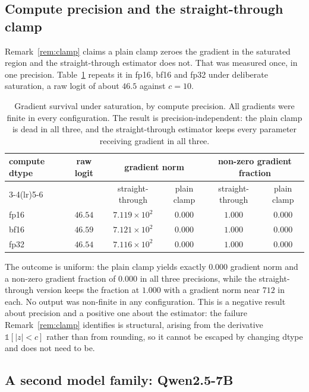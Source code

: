 \documentclass[10pt]{article}
\theoremstyle{plain}
\theoremstyle{definition}
\theoremstyle{remark}
\begin{document}
\subsection{Compute precision and the straight-through clamp}
\label{sec:precision}

Remark~\ref{rem:clamp} claims a plain clamp zeroes the gradient in the saturated region
and the straight-through estimator does not. That was measured once, in one precision.
Table~\ref{tab:precision} repeats it in fp16, bf16 and fp32 under deliberate saturation, a
raw logit of about $46.5$ against $c{=}10$.

\begin{table}[!ht]
\centering\small
\begin{tabular}{lccccc}
\toprule
compute dtype & raw logit & \multicolumn{2}{c}{gradient norm} &
\multicolumn{2}{c}{non-zero gradient fraction}\\
\cmidrule(lr){3-4}\cmidrule(lr){5-6}
& & straight-through & plain clamp & straight-through & plain clamp\\
\midrule
fp16 & $46.54$ & $7.119\times10^{2}$ & $0.000$ & $1.000$ & $0.000$\\
bf16 & $46.59$ & $7.121\times10^{2}$ & $0.000$ & $1.000$ & $0.000$\\
fp32 & $46.54$ & $7.116\times10^{2}$ & $0.000$ & $1.000$ & $0.000$\\
\bottomrule
\end{tabular}
\caption{Gradient survival under saturation, by compute precision. All gradients were
finite in every configuration. The result is precision-independent: the plain clamp is
dead in all three, and the straight-through estimator keeps every parameter receiving
gradient in all three.}
\label{tab:precision}
\end{table}

The outcome is uniform: the plain clamp yields exactly $0.000$ gradient norm and a
non-zero gradient fraction of $0.000$ in all three precisions, while the straight-through
version keeps the fraction at $1.000$ with a gradient norm near $712$ in each. No output
was non-finite in any configuration. This is a negative result about precision and a
positive one about the estimator: the failure Remark~\ref{rem:clamp} identifies is
structural, arising from the derivative $\mathbb{1}[|z|<c]$ rather than from rounding, so
it cannot be escaped by changing dtype and does not need to be.

\subsection{A second model family: Qwen2.5-7B}
\label{sec:qwen}
\end{document}
